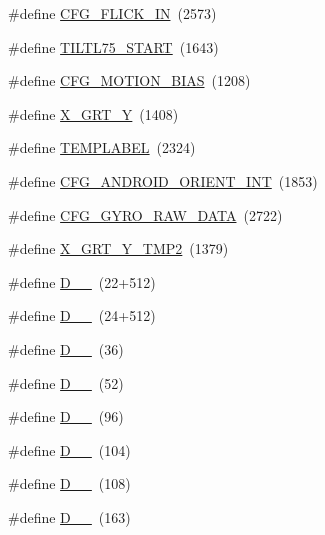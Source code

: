 \begin{DoxyCompactItemize}
\item 
\#define \hyperlink{group___d_r_i_v_e_r_s_gad4e759975ee4ab865e8bd1ebd7f48908}{C\+F\+G\+\_\+\+F\+L\+I\+C\+K\+\_\+\+IN}~(2573)
\item 
\#define \hyperlink{group___d_r_i_v_e_r_s_ga0ca3aa6c4c503f68cab0bbba28325f12}{T\+I\+L\+T\+L75\+\_\+\+S\+T\+A\+RT}~(1643)
\item 
\#define \hyperlink{group___d_r_i_v_e_r_s_ga8214527cbba23694722d04715126be0f}{C\+F\+G\+\_\+\+M\+O\+T\+I\+O\+N\+\_\+\+B\+I\+AS}~(1208)
\item 
\#define \hyperlink{group___d_r_i_v_e_r_s_ga70e52e79b5774e056a86795a52e3b027}{X\+\_\+\+G\+R\+T\+\_\+Y}~(1408)
\item 
\#define \hyperlink{group___d_r_i_v_e_r_s_gaf08a08d5d5c6944564fe84a46227968d}{T\+E\+M\+P\+L\+A\+B\+EL}~(2324)
\item 
\#define \hyperlink{group___d_r_i_v_e_r_s_gacc91af9a664cf438b93a3faa108bb603}{C\+F\+G\+\_\+\+A\+N\+D\+R\+O\+I\+D\+\_\+\+O\+R\+I\+E\+N\+T\+\_\+\+I\+NT}~(1853)
\item 
\#define \hyperlink{group___d_r_i_v_e_r_s_ga01dcbc69fa28559529653a3b4aabea00}{C\+F\+G\+\_\+\+G\+Y\+R\+O\+\_\+\+R\+A\+W\+\_\+\+D\+A\+TA}~(2722)
\item 
\#define \hyperlink{group___d_r_i_v_e_r_s_ga193d85c2bd5dd9e43c1f89445e999ac6}{X\+\_\+\+G\+R\+T\+\_\+\+Y\+\_\+\+T\+M\+P2}~(1379)
\item 
\#define \hyperlink{group___d_r_i_v_e_r_s_ga155b1481095edac7a26c8c3d5b9c5a24}{D\+\_\+\_}~(22+512)
\item 
\#define \hyperlink{group___d_r_i_v_e_r_s_ga15d46d25c01d6bc9c849c3ba42dcfa54}{D\+\_\+\_}~(24+512)
\item 
\#define \hyperlink{group___d_r_i_v_e_r_s_ga98e58a52ab30dcc007284b185347cf0f}{D\+\_\+\_}~(36)
\item 
\#define \hyperlink{group___d_r_i_v_e_r_s_gaa3d478603bf46f77a6eb95f2c71ee48e}{D\+\_\+\_}~(52)
\item 
\#define \hyperlink{group___d_r_i_v_e_r_s_ga7e992a46da86f1d053f9ef5fc2e53b7a}{D\+\_\+\_}~(96)
\item 
\#define \hyperlink{group___d_r_i_v_e_r_s_ga5edbce4fdd515aa31a227fb8eaf0151f}{D\+\_\+\_}~(104)
\item 
\#define \hyperlink{group___d_r_i_v_e_r_s_gabbbb1d6730f23abc1e951d7741fa24d5}{D\+\_\+\_}~(108)
\item 
\#define \hyperlink{group___d_r_i_v_e_r_s_ga4d6d669548fe77f07062baf9e452fb06}{D\+\_\+\_}~(163)

\end{DoxyCompactItemize}
